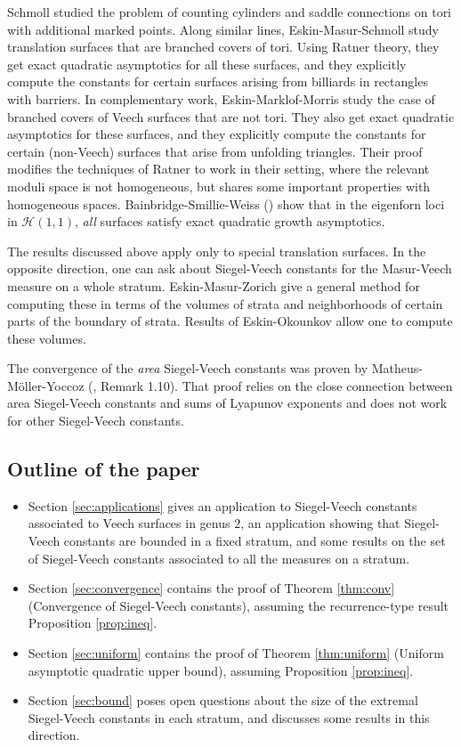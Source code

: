 \documentclass{article}
\theoremstyle{definition}
\begin{document}
Schmoll \cite{schmoll2002}  studied the problem of counting cylinders and saddle connections on tori with additional marked points.  Along similar lines, Eskin-Masur-Schmoll \cite{ems2003} study translation surfaces that are branched covers of tori.  Using Ratner theory, they get exact quadratic asymptotics for all these surfaces, and they explicitly compute the constants for certain surfaces arising from billiards in rectangles with barriers.  In complementary work, Eskin-Marklof-Morris \cite{emm2006} study the case of branched covers of Veech surfaces that are not tori.  They also get exact quadratic asymptotics for these surfaces, and they explicitly compute the constants for certain (non-Veech) surfaces that arise from unfolding triangles.  Their proof modifies the techniques of Ratner to work in their setting, where the relevant moduli space is not homogeneous, but shares some important properties with homogeneous spaces.  Bainbridge-Smillie-Weiss (\cite{bsw2016}) show that in the eigenforn loci in $\mathcal{H}(1,1)$, \emph{all} surfaces satisfy exact quadratic growth asymptotics.  

The results discussed above apply only to special translation surfaces.  In the opposite direction, one can ask about Siegel-Veech constants for the Masur-Veech measure on a whole stratum.  Eskin-Masur-Zorich \cite{emz2003} give a general method for computing these in terms of the volumes of strata and neighborhoods of certain parts of the boundary of strata.  Results of Eskin-Okounkov \cite{eo2001} allow one to compute these volumes.  

The convergence of the \emph{area} Siegel-Veech constants was proven by Matheus-M\"{o}ller-Yoccoz (\cite{mmy2015}, Remark 1.10).  That proof relies on the close connection between area Siegel-Veech constants and sums of Lyapunov exponents and does not work for other Siegel-Veech constants.  



\subsection{Outline of the paper}
\begin{itemize}
\item Section \ref{sec:applications} gives an application to Siegel-Veech constants associated to Veech surfaces in genus $2$, an application showing that Siegel-Veech constants are bounded in a fixed stratum, and some results on the set of Siegel-Veech constants associated to all the measures on a stratum.  
\item Section \ref{sec:convergence} contains the proof of Theorem \ref{thm:conv} (Convergence of Siegel-Veech constants), assuming the recurrence-type result Proposition \ref{prop:ineq}.
\item Section \ref{sec:uniform} contains the proof of Theorem \ref{thm:uniform} (Uniform asymptotic quadratic upper bound), assuming Proposition \ref{prop:ineq}.
\item Section \ref{sec:bound} poses open questions about the size of the extremal Siegel-Veech constants in each stratum, and discusses some results in this direction.  
\end{itemize}
\end{document}
